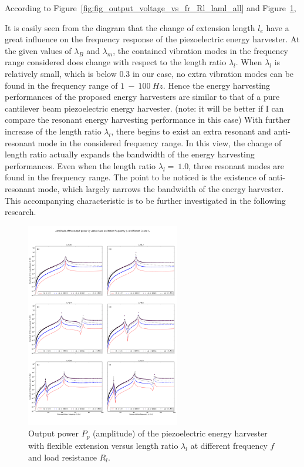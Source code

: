 \documentclass{elsarticle}
\begin{document}
According to Figure~\ref{fig:fig_output_voltage_vs_fr_Rl_laml_all} and Figure~\ref{fig:fig_output_power_vs_fr_Rl_laml_all}, 

It is easily seen from the diagram that the change of extension length $l_e$ have a great influence on the frequency response of the piezoelectric energy harvester. At the given values of $\lambda_B$ and $\lambda_m$, the contained vibration modes in the frequency range considered does change with respect to
the length ratio $\lambda_l$. When $\lambda_l$ is relatively small, which is below $0.3$ in our case, no extra vibration modes can be found in the frequency range of $1\ - \ 100\ Hz$. Hence the energy harvesting performances of the proposed energy harvesters are similar to that of a pure cantilever beam piezoelectric energy harvester. (note: it will be better if I can compare the resonant energy harvesting performance in this case) With further increase of the length ratio $\lambda_l$, there begins to exist an extra resonant and anti-resonant mode in the considered frequency range. In this view, the change of length ratio actually expands the bandwidth of the energy harvesting performances. Even when the length ratio $\lambda_l =\ 1.0$, three resonant modes are found in the frequency range. The point to be noticed is the existence of anti-resonant mode, which largely narrows the bandwidth of the energy harvester. This accompanying characteristic is to be further investigated in the following research. 

\begin{figure}[!htbp]
    \centering
    \includegraphics[width=0.6\textwidth]{./fig_output_power_vs_fr_Rl_laml_all}
    \caption{Output power $P_p$ (amplitude) of the piezoelectric energy harvester with flexible extension versus length ratio $\lambda_l$ at different frequency $f$ and load resistance $R_l$. }
    \label{fig:fig_output_power_vs_fr_Rl_laml_all}
\end{figure}
\end{document}
